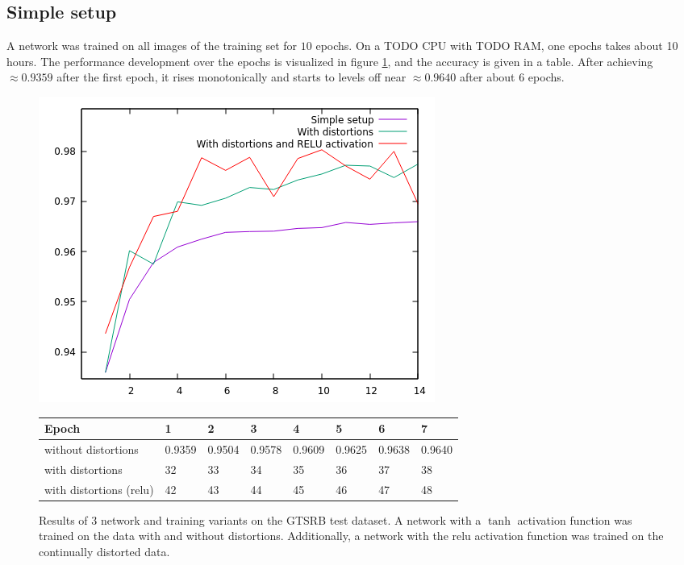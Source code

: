 \documentclass[11pt, a4paper]{article}
\begin{document}
\subsection{Simple setup}
\label{subsec:simplesetup}
A network was trained on all images of the training set for $10$ epochs. On a TODO CPU with TODO RAM, one epochs takes about 10 hours. The performance development over the epochs is visualized in figure \ref{fig:gtsrb-results}, and the accuracy is given in a table. After achieving $\approx 0.9359$ after the first epoch, it rises monotonically and starts to levels off near $\approx 0.9640$ after about 6 epochs.

\begin{figure}[h!]
	\centering
	\includegraphics{gtsrb_results}
	\begin{tabular}{|l|lllllll|}
		\hline
		Epoch & 1 & 2 & 3 & 4 & 5 & 6 & 7\\
		\hline
		without distortions & 0.9359 & 0.9504 & 0.9578 & 0.9609 & 0.9625 & 0.9638 & 0.9640\\
		with distortions & 32 & 33 & 34 & 35 & 36 & 37 & 38\\
		with distortions (relu) & 42 & 43 & 44 & 45 & 46 & 47 & 48\\
		\hline
	\end{tabular}
	\caption{Results of 3 network and training variants on the GTSRB test dataset. A network with a $\tanh$ activation function was trained on the data with and without distortions. Additionally, a network with the relu activation function was trained on the continually distorted data.}
	\label{fig:gtsrb-results}
\end{figure}
\end{document}
